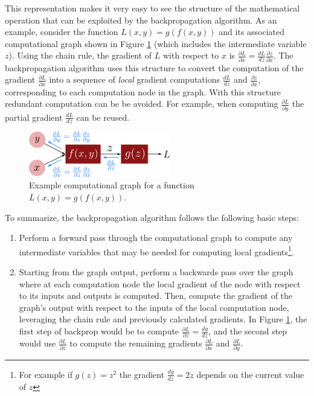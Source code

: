 This representation makes it very easy to see the structure of the mathematical operation that can be exploited by the backpropagation algorithm.
As an example, consider the function $L(x,y) = g(f(x,y))$ and its associated computational graph shown in Figure \ref{fig:backprop} (which includes the intermediate variable $z$). Using the chain rule, the gradient of $L$ with respect to $x$ is $\frac{\partial L}{\partial x} = \frac{dL}{dz}\frac{\partial z}{\partial x}$. The backpropagation algorithm uses this structure to convert the computation of the gradient $\frac{\partial L}{\partial x}$ into a sequence of \textit{local} gradient computations $\frac{dL}{dz}$ and $\frac{\partial z}{\partial x}$, corresponding to each computation node in the graph. With this structure redundant computation can be be avoided. For example, when computing $\frac{\partial L}{\partial y}$ the partial gradient $\frac{dL}{dz}$ can be reused.

\begin{figure}[ht]
\begin{center}
\includegraphics[width=0.55\textwidth]{tex/figs/app01_figs/backprop.png}
\caption{Example computational graph for a function $L(x,y) = g(f(x,y))$.}
\label{fig:backprop}
\end{center}
\end{figure}

To summarize, the backpropagation algorithm follows the following basic steps:
\begin{enumerate}
    \item Perform a forward pass through the computational graph to compute any intermediate variables that may be needed for computing local gradients\footnote{For example if $g(z) = z^2$ the gradient $\frac{dg}{dz} = 2z$ depends on the current value of $z$}.
    \item Starting from the graph output, perform a backwards pass over the graph where at each computation node the local gradient of the node with respect to its inputs and outputs is computed. Then, compute the gradient of the graph's output with respect to the inputs of the local computation node, leveraging the chain rule and previously calculated gradients. In Figure \ref{fig:backprop}, the first step of backprop would be to compute $\frac{\partial L}{\partial z} = \frac{d g}{d z}$, and the second step would use $\frac{\partial L}{\partial z}$ to compute the remaining gradients $\frac{\partial L}{\partial x}$ and $\frac{\partial L}{\partial y}$.
\end{enumerate}




